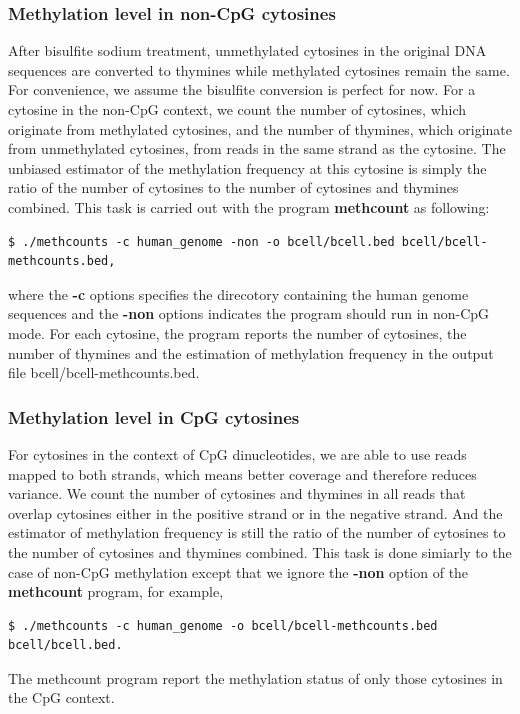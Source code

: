 \documentclass{article}
\begin{document}
\subsubsection{Methylation level in non-CpG cytosines}
\label{sec:methyl-level-non}
 
After bisulfite sodium treatment, unmethylated cytosines in the
original DNA sequences are converted to thymines while methylated
cytosines remain the same. For convenience, we assume the bisulfite
conversion is perfect for now. For a cytosine in the non-CpG context,
we count the number of cytosines, which originate from methylated
cytosines, and the number of thymines, which originate from
unmethylated cytosines, from reads in the same strand as the
cytosine. The unbiased estimator of the methylation frequency at this
cytosine is simply the ratio of the number of cytosines to the number
of cytosines and thymines combined. This task is carried out with the
program \textbf{methcount} as following:
\begin{verbatim}
$ ./methcounts -c human_genome -non -o bcell/bcell.bed bcell/bcell-methcounts.bed,  
\end{verbatim}
where the \textbf{-c} options specifies the direcotory containing the
human genome sequences and the \textbf{-non} options indicates the
program should run in non-CpG mode. For each cytosine, the program
reports the number of cytosines, the number of thymines and the
estimation of methylation frequency in the output file
bcell/bcell-methcounts.bed. 

\subsubsection{Methylation level in CpG cytosines}
\label{sec:methyl-level-cpg}

For cytosines in the context of CpG dinucleotides, we are able to use
reads mapped to both strands, which means better coverage and
therefore reduces variance. We count the number of
cytosines and thymines in all reads that overlap cytosines either in
the positive strand or in the negative strand. And the estimator of
methylation frequency is still the ratio of the number of cytosines to
the number of cytosines and thymines combined. This task is done
simiarly to the case of non-CpG methylation except that we ignore the
\textbf{-non} option of the \textbf{methcount} program, for example, 
\begin{verbatim}
$ ./methcounts -c human_genome -o bcell/bcell-methcounts.bed bcell/bcell.bed.  
\end{verbatim}
The methcount program report the methylation status of only those
cytosines in the CpG context. 
\end{document}
